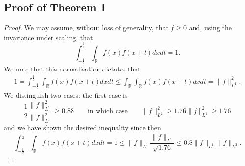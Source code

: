 \documentclass{amsart}
\theoremstyle{remark}
\begin{document}
{\subsection{Proof of Theorem 1}

\begin{proof} We may assume, without loss of generality, that $f \geq 0$ and, using the invariance under scaling, that
$$ \int_{-\frac{1}{2}}^{\frac{1}{2}}{ \int_{\mathbb{R}}{f(x) f(x+t) dx}dt} =1.$$
We note that this normalisation dictates that
\begin{align*}
 1=\int_{-\frac12}^{\frac12}{ \int_{\mathbb{R}}{f(x) f(x+t) dx}dt}  \leq \int_{\mathbb{R}}^{} \int_{\mathbb{R}}{f(x) f(x+t) dx} dt = \|f\|_{L^1}^2.
\end{align*}
We distinguish two cases: the first case is
$$ \frac{1}{2}\frac{\|f\|_{L^2}^2}{\|f\|_{L^1}^{2}} \geq 0.88 \qquad \mbox{in which case} \qquad \|f\|_{L^2}^2 \geq 1.76 \|f\|_{L^1}^2 \geq 1.76$$
and we have shown the desired inequality since then
$$ \int_{-\frac{1}{2}}^{\frac{1}{2}}{ \int_{\mathbb{R}}{f(x) f(x+t) dx}dt} =1 \leq \|f\|_{L^1} \frac{\| f\|_{L^2}}{\sqrt{1.76}} \leq 0.8 \|f\|_{L^1} \|f\|_{L^2}.$$



\end{proof}}
\end{document}
